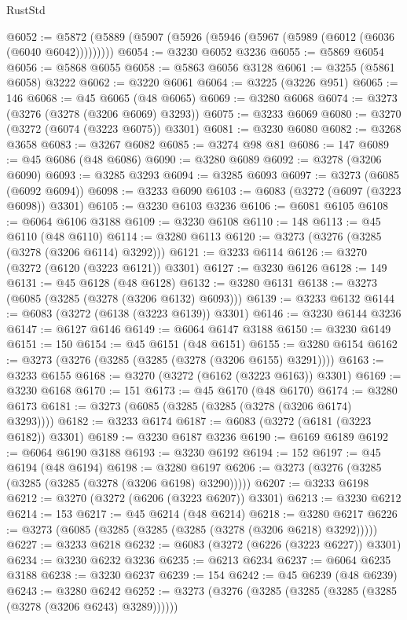 \begin{lexlean}{RustStd}
\begin{coremodule}
@6052 := @5872 (@5889 (@5907 (@5926 (@5946 (@5967 (@5989 (@6012 (@6036 (@6040 @6042)))))))))
@6054 := @3230 @6052 @3236
@6055 := @5869 @6054
@6056 := @5868 @6055
@6058 := @5863 @6056 @3128
@6061 := @3255 (@5861 @6058) @3222
@6062 := @3220 @6061
@6064 := @3225 (@3226 @951)
@6065 := 146
@6068 := @45 @6065 (@48 @6065)
@6069 := @3280 @6068
@6074 := @3273 (@3276 (@3278 (@3206 @6069) @3293))
@6075 := @3233 @6069
@6080 := @3270 (@3272 (@6074 (@3223 @6075)) @3301)
@6081 := @3230 @6080
@6082 := @3268 @3658
@6083 := @3267 @6082
@6085 := @3274 @98 @81
@6086 := 147
@6089 := @45 @6086 (@48 @6086)
@6090 := @3280 @6089
@6092 := @3278 (@3206 @6090)
@6093 := @3285 @3293
@6094 := @3285 @6093
@6097 := @3273 (@6085 (@6092 @6094))
@6098 := @3233 @6090
@6103 := @6083 (@3272 (@6097 (@3223 @6098)) @3301)
@6105 := @3230 @6103 @3236
@6106 := @6081 @6105
@6108 := @6064 @6106 @3188
@6109 := @3230 @6108
@6110 := 148
@6113 := @45 @6110 (@48 @6110)
@6114 := @3280 @6113
@6120 := @3273 (@3276 (@3285 (@3278 (@3206 @6114) @3292)))
@6121 := @3233 @6114
@6126 := @3270 (@3272 (@6120 (@3223 @6121)) @3301)
@6127 := @3230 @6126
@6128 := 149
@6131 := @45 @6128 (@48 @6128)
@6132 := @3280 @6131
@6138 := @3273 (@6085 (@3285 (@3278 (@3206 @6132) @6093)))
@6139 := @3233 @6132
@6144 := @6083 (@3272 (@6138 (@3223 @6139)) @3301)
@6146 := @3230 @6144 @3236
@6147 := @6127 @6146
@6149 := @6064 @6147 @3188
@6150 := @3230 @6149
@6151 := 150
@6154 := @45 @6151 (@48 @6151)
@6155 := @3280 @6154
@6162 := @3273 (@3276 (@3285 (@3285 (@3278 (@3206 @6155) @3291))))
@6163 := @3233 @6155
@6168 := @3270 (@3272 (@6162 (@3223 @6163)) @3301)
@6169 := @3230 @6168
@6170 := 151
@6173 := @45 @6170 (@48 @6170)
@6174 := @3280 @6173
@6181 := @3273 (@6085 (@3285 (@3285 (@3278 (@3206 @6174) @3293))))
@6182 := @3233 @6174
@6187 := @6083 (@3272 (@6181 (@3223 @6182)) @3301)
@6189 := @3230 @6187 @3236
@6190 := @6169 @6189
@6192 := @6064 @6190 @3188
@6193 := @3230 @6192
@6194 := 152
@6197 := @45 @6194 (@48 @6194)
@6198 := @3280 @6197
@6206 := @3273 (@3276 (@3285 (@3285 (@3285 (@3278 (@3206 @6198) @3290)))))
@6207 := @3233 @6198
@6212 := @3270 (@3272 (@6206 (@3223 @6207)) @3301)
@6213 := @3230 @6212
@6214 := 153
@6217 := @45 @6214 (@48 @6214)
@6218 := @3280 @6217
@6226 := @3273 (@6085 (@3285 (@3285 (@3285 (@3278 (@3206 @6218) @3292)))))
@6227 := @3233 @6218
@6232 := @6083 (@3272 (@6226 (@3223 @6227)) @3301)
@6234 := @3230 @6232 @3236
@6235 := @6213 @6234
@6237 := @6064 @6235 @3188
@6238 := @3230 @6237
@6239 := 154
@6242 := @45 @6239 (@48 @6239)
@6243 := @3280 @6242
@6252 := @3273 (@3276 (@3285 (@3285 (@3285 (@3285 (@3278 (@3206 @6243) @3289))))))

\end{coremodule}
\end{lexlean}
